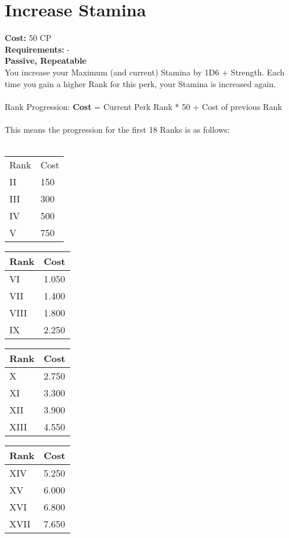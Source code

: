 \section{Increase Stamina}\label{perk:increasestamina}
\textbf{Cost:} 50 CP\\
\textbf{Requirements:} -\\
\textbf{Passive, Repeatable}\\
You increase your Maximum (and current)  Stamina by 1D6 + Strength.
Each time you gain a higher Rank for this perk, your Stamina is increased again.\\
\\
Rank Progression: \textbf{Cost} = Current Perk Rank * 50 + Cost of previous Rank\\
\\
This  means the progression for the first 18 Ranks is as follows:\\
\\
\begin{minipage}{0.25\textwidth}
    \begin{tabular}{l | l}
        Rank & Cost\\
        II & 150\\
        III & 300\\
        IV & 500\\
        V & 750\\
    \end{tabular}
\end{minipage}
\begin{minipage}{0.25\textwidth}
    \begin{tabular}{l | l}
        Rank & Cost\\ \hline
        VI & 1.050\\
        VII & 1.400\\
        VIII & 1.800\\
        IX & 2.250\\
    \end{tabular}
\end{minipage}
\begin{minipage}{0.25\textwidth}
    \begin{tabular}{l | l}
        Rank & Cost\\ \hline
        X & 2.750\\
        XI & 3.300\\
        XII & 3.900\\
        XIII & 4.550\\
    \end{tabular}
\end{minipage}
\begin{minipage}{0.25\textwidth}
    \begin{tabular}{l | l}
        Rank & Cost\\ \hline
        XIV & 5.250\\
        XV & 6.000\\
        XVI & 6.800\\
        XVII & 7.650\\
    \end{tabular}
\end{minipage}